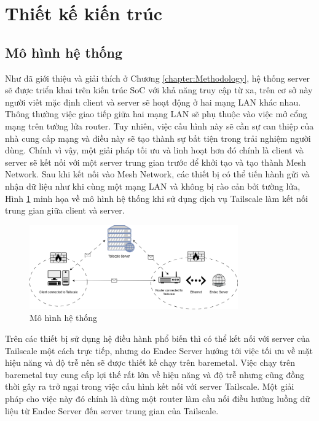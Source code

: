 \documentclass[../DoAn.tex]{subfiles}
\begin{document}
\section{Thiết kế kiến trúc}
\subsection{Mô hình hệ thống}
\label{subsection:Mô hình hệ thống}
Như đã giới thiệu và giải thích ở Chương \ref{chapter:Methodology}, hệ thống server sẽ được triển khai trên kiến trúc SoC với khả năng truy cập từ xa, trên cơ sở này người viết mặc định client và server sẽ hoạt động ở hai mạng LAN khác nhau. Thông thường việc giao tiếp giữa hai mạng LAN sẽ phụ thuộc vào việc mở cổng mạng trên tường lửa router. Tuy nhiên, việc cấu hình này sẽ cần sự can thiệp của nhà cung cấp mạng và điều này sẽ tạo thành sự bất tiện trong trải nghiệm người dùng. Chính vì vậy, một giải pháp tối ưu và linh hoạt hơn đó chính là client và server sẽ kết nối với một server trung gian trước để khởi tạo và tạo thành Mesh Network. Sau khi kết nối vào Mesh Network, các thiết bị có thể tiến hành gửi và nhận dữ liệu như khi cùng một mạng LAN và không bị rào cản bởi tường lửa, Hình \ref{fig:Mô hình hệ thống} minh họa về mô hình hệ thống khi sử dụng dịch vụ Tailscale làm kết nối trung gian giữa client và server.

\begin{figure}[H]
    \centering
    \includegraphics[width=0.8\textwidth, height=0.25\textheight, keepaspectratio]{Hinhve/Chuong 4/Device Diagram.png}
    \caption{Mô hình hệ thống}
    \label{fig:Mô hình hệ thống}
\end{figure}

Trên các thiết bị sử dụng hệ điều hành phổ biến thì có thể kết nối với server của Tailscale một cách trực tiếp, nhưng do Endec Server hướng tới việc tối ưu về mặt hiệu năng và độ trễ nên sẽ được thiết kế chạy trên baremetal. Việc chạy trên baremetal tuy cung cấp lợi thế rất lớn về hiệu năng và độ trễ nhưng cũng đồng thời gây ra trở ngại trong việc cấu hình kết nối với server Tailscale. Một giải pháp cho việc này đó chính là dùng một router làm cầu nối điều hướng luồng dữ liệu từ Endec Server đến server trung gian của Tailscale.
\end{document}
